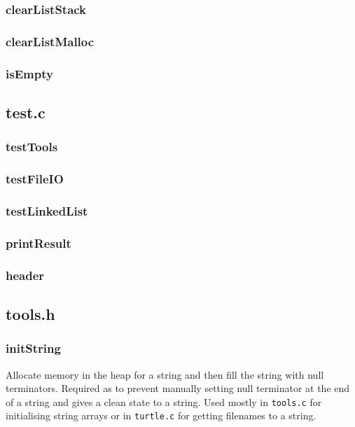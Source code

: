 \documentclass[a4paper, 12pt, titlepage]{article}
\newcommand{\code}[1]{\small\texttt{#1}\normalsize}
\begin{document}
\subsubsection{clearListStack}

\subsubsection{clearListMalloc}

\subsubsection{isEmpty}

\subsection{test.c}
\subsubsection{testTools}

\subsubsection{testFileIO}

\subsubsection{testLinkedList}

\subsubsection{printResult}

\subsubsection{header}

\subsection{tools.h}
\subsubsection{initString}

Allocate memory in the heap for a string and then fill the string with null 
terminators. Required as to prevent manually setting null terminator at the 
end of a string and gives a clean state to a string. Used mostly in 
\code{tools.c} for initialising string arrays or in \code{turtle.c} for 
getting filenames to a string.
\end{document}
